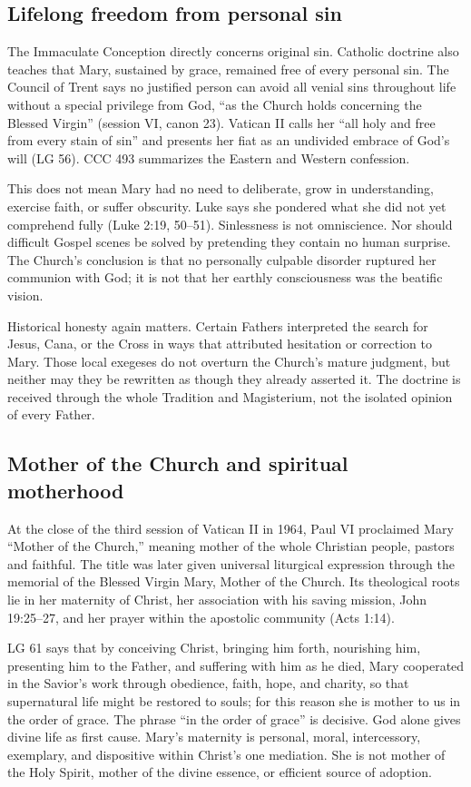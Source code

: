 \subsection{Lifelong freedom from personal sin}

The Immaculate Conception directly concerns original sin. Catholic doctrine also teaches that Mary, sustained by grace, remained free of every personal sin. The Council of Trent says no justified person can avoid all venial sins throughout life without a special privilege from God, ``as the Church holds concerning the Blessed Virgin'' (session VI, canon 23). Vatican II calls her ``all holy and free from every stain of sin'' and presents her fiat as an undivided embrace of God's will (LG 56). CCC 493 summarizes the Eastern and Western confession.

This does not mean Mary had no need to deliberate, grow in understanding, exercise faith, or suffer obscurity. Luke says she pondered what she did not yet comprehend fully (Luke 2:19, 50--51). Sinlessness is not omniscience. Nor should difficult Gospel scenes be solved by pretending they contain no human surprise. The Church's conclusion is that no personally culpable disorder ruptured her communion with God; it is not that her earthly consciousness was the beatific vision.

Historical honesty again matters. Certain Fathers interpreted the search for Jesus, Cana, or the Cross in ways that attributed hesitation or correction to Mary. Those local exegeses do not overturn the Church's mature judgment, but neither may they be rewritten as though they already asserted it. The doctrine is received through the whole Tradition and Magisterium, not the isolated opinion of every Father.

\subsection{Mother of the Church and spiritual motherhood}

At the close of the third session of Vatican II in 1964, Paul VI proclaimed Mary ``Mother of the Church,'' meaning mother of the whole Christian people, pastors and faithful. The title was later given universal liturgical expression through the memorial of the Blessed Virgin Mary, Mother of the Church. Its theological roots lie in her maternity of Christ, her association with his saving mission, John 19:25--27, and her prayer within the apostolic community (Acts 1:14).

LG 61 says that by conceiving Christ, bringing him forth, nourishing him, presenting him to the Father, and suffering with him as he died, Mary cooperated in the Savior's work through obedience, faith, hope, and charity, so that supernatural life might be restored to souls; for this reason she is mother to us in the order of grace. The phrase ``in the order of grace'' is decisive. God alone gives divine life as first cause. Mary's maternity is personal, moral, intercessory, exemplary, and dispositive within Christ's one mediation. She is not mother of the Holy Spirit, mother of the divine essence, or efficient source of adoption.


